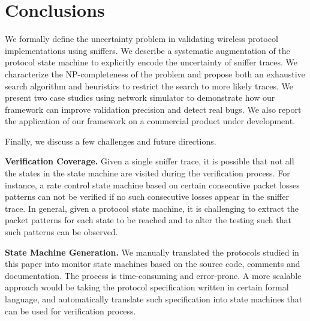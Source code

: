 \section{Conclusions}
\label{sec:conclusion}

We formally define the uncertainty problem in validating wireless protocol
implementations using sniffers. We describe a systematic augmentation of the
protocol state machine to explicitly encode the uncertainty of sniffer traces.
We characterize the NP-completeness of the problem and propose both an
exhaustive search algorithm and heuristics to restrict the search to more likely
traces. We present two case studies using \ns{} network simulator to demonstrate
how our framework can improve validation precision and detect real bugs. We also
report the application of our framework on a commercial product under
development.

Finally, we discuss a few challenges and future
directions.

\textbf{Verification Coverage.} Given a single sniffer trace, it is possible
that not all the states in the state machine are visited during the verification
process. For instance, a rate control state machine based on certain consecutive
packet losses patterns can not be verified if no such consecutive losses appear
in the sniffer trace. In general, given a protocol state machine, it is
challenging to extract the packet patterns for each state to be reached and to
alter the testing such that such patterns can be observed.

\textbf{State Machine Generation.} We manually translated the protocols studied
in this paper into monitor state machines based on the source code, comments and
documentation. The process is time-consuming and error-prone. A more scalable
approach would be taking the protocol specification written in certain formal
language, and automatically translate such specification into state machines
that can be used for verification process.
